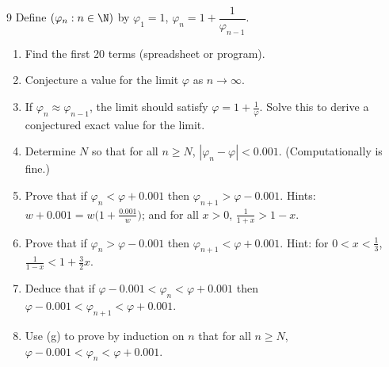 \begin{exercise}{9}
    Define $(\varphi_n:n\in\N)$ by $\varphi_1=1$,
    $\varphi_n=1+\dfrac1{\varphi_{n-1}}$.
    \begin{enumerate}[label=(\alph*)]
        \item Find the first 20 terms (spreadsheet or program).
        \item Conjecture a value for the limit $\varphi$ as $n\to\infty$.
        \item If $\varphi_n\approx\varphi_{n-1}$, the limit should satisfy
              $\varphi=1+\frac1\varphi$. Solve this to derive a conjectured exact
              value for the limit.
        \item Determine $N$ so that for all $n\ge N$,
              $|\varphi_n-\varphi|<0.001$. (Computationally is fine.)
        \item Prove that if $\varphi_n<\varphi+0.001$ then
              $\varphi_{n+1}>\varphi-0.001$.
              Hints: $w+0.001=w\bigl(1+\frac{0.001}w\bigr)$; and for all $x>0$,
              $\frac1{1+x}>1-x$.
        \item Prove that if $\varphi_n>\varphi-0.001$ then
              $\varphi_{n+1}<\varphi+0.001$.
              Hint: for $0<x<\frac13$, $\frac1{1-x}<1+\frac32x$.
        \item Deduce that if $\varphi-0.001<\varphi_n<\varphi+0.001$ then
              $\varphi-0.001<\varphi_{n+1}<\varphi+0.001$.
        \item Use (g) to prove by induction on $n$ that for all $n\ge N$,
              $\varphi-0.001<\varphi_n<\varphi+0.001$.
    \end{enumerate}
\end{exercise}

